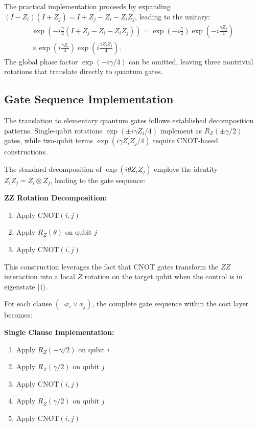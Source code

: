 \documentclass[%
 reprint,
 amsmath,amssymb,
 aps,
]{revtex4-2}
\begin{document}
The practical implementation proceeds by expanding $(I - Z_i)(I + Z_j) = I + Z_j - Z_i - Z_iZ_j$, leading to the unitary:
\begin{multline}
\exp\left(-i\frac{\gamma}{4}(I + Z_j - Z_i - Z_iZ_j)\right) = \exp\left(-i\frac{\gamma}{4}\right)\exp\left(-i\frac{\gamma Z_j}{4}\right) \\
\times \exp\left(i\frac{\gamma Z_i}{4}\right)\exp\left(i\frac{\gamma Z_iZ_j}{4}\right).
\label{eq:expanded_unitary}
\end{multline}
The global phase factor $\exp(-i\gamma/4)$ can be omitted, leaving three nontrivial rotations that translate directly to quantum gates.

\subsection{Gate Sequence Implementation}
\label{subsec:gate_implementation}

The translation to elementary quantum gates follows established decomposition patterns. Single-qubit rotations $\exp(\pm i\gamma Z_i/4)$ implement as $R_Z(\pm\gamma/2)$ gates, while two-qubit terms $\exp(i\gamma Z_iZ_j/4)$ require CNOT-based constructions.

The standard decomposition of $\exp(i\theta Z_iZ_j)$ employs the identity $Z_iZ_j = Z_i \otimes Z_j$, leading to the gate sequence:

\noindent\textbf{ZZ Rotation Decomposition:}
\begin{enumerate}
\item Apply CNOT$(i, j)$
\item Apply $R_Z(\theta)$ on qubit $j$
\item Apply CNOT$(i, j)$
\end{enumerate}

This construction leverages the fact that CNOT gates transform the $ZZ$ interaction into a local $Z$ rotation on the target qubit when the control is in eigenstate $|1\rangle$.

For each clause $(\neg x_i \vee x_j)$, the complete gate sequence within the cost layer becomes:

\noindent\textbf{Single Clause Implementation:}
\begin{enumerate}
\item Apply $R_Z(-\gamma/2)$ on qubit $i$
\item Apply $R_Z(\gamma/2)$ on qubit $j$
\item Apply CNOT$(i, j)$
\item Apply $R_Z(\gamma/2)$ on qubit $j$
\item Apply CNOT$(i, j)$
\end{enumerate}
\end{document}
